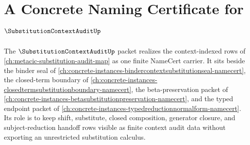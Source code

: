 \chapter{A Concrete Naming Certificate for $\SubstitutionContextAuditUp$}
\label{ch:concrete-instances-substitutioncontextaudit-namecert}

The $\SubstitutionContextAuditUp$ packet realizes the context-indexed rows of \autoref{ch:metacic-substitution-audit-map} as one finite NameCert carrier. It sits beside the binder seal of \autoref{ch:concrete-instances-bindercontextsubstitutionseal-namecert}, the closed-term boundary of \autoref{ch:concrete-instances-closedtermsubstitutionboundary-namecert}, the beta-preservation packet of \autoref{ch:concrete-instances-betasubstitutionpreservation-namecert}, and the typed endpoint packet of \autoref{ch:concrete-instances-typedreductionnormalform-namecert}. Its role is to keep shift, substitute, closed composition, generator closure, and subject-reduction handoff rows visible as finite context audit data without exporting an unrestricted substitution calculus.


